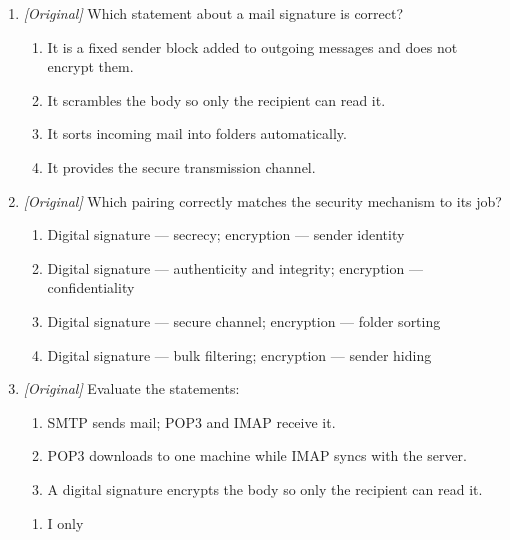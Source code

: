 \documentclass[11pt]{article}
\begin{document}
\begin{enumerate}[label=\textbf{Q\arabic*.}, leftmargin=*]
  based on the sender and subject. What is this feature?
  \begin{enumerate}[label=\Alph*.]
    \item A filter (rule) sorting incoming mail
    \item A digital signature on outgoing mail
    \item Encryption of the message body
    \item A blind carbon copy
  \end{enumerate}
\item \textit{[Original]} Which statement about a mail signature is correct?
  \begin{enumerate}[label=\Alph*.]
    \item It is a fixed sender block added to outgoing messages and does not encrypt them.
    \item It scrambles the body so only the recipient can read it.
    \item It sorts incoming mail into folders automatically.
    \item It provides the secure transmission channel.
  \end{enumerate}
\item \textit{[Original]} Which pairing correctly matches the security
  mechanism to its job?
  \begin{enumerate}[label=\Alph*.]
    \item Digital signature --- secrecy; encryption --- sender identity
    \item Digital signature --- authenticity and integrity; encryption --- confidentiality
    \item Digital signature --- secure channel; encryption --- folder sorting
    \item Digital signature --- bulk filtering; encryption --- sender hiding
  \end{enumerate}
\item \textit{[Original]} Evaluate the statements:
  \begin{enumerate}[label=\Roman*.]
    \item SMTP sends mail; POP3 and IMAP receive it.
    \item POP3 downloads to one machine while IMAP syncs with the server.
    \item A digital signature encrypts the body so only the recipient can read it.
  \end{enumerate}
  \begin{enumerate}[label=\Alph*.]
    \item I only

\end{enumerate}
\end{enumerate}
\end{document}
